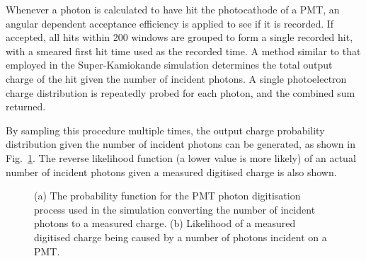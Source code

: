 Whenever a photon is calculated to have hit the photocathode of a PMT, an angular dependent
acceptance efficiency is applied to see if it is recorded. If accepted, all hits within
\unit{200}{} windows are grouped to form a single recorded hit, with a smeared first
hit time used as the recorded time. A method similar to that employed in the Super-Kamiokande
simulation determines the total output charge of the hit given the number of incident photons. A
single photoelectron charge distribution is repeatedly probed for each photon, and the combined
sum returned.

By sampling this procedure multiple times, the output charge probability distribution given the
number of incident photons can be generated, as shown in Fig.~\ref{fig:digitisation}. The reverse
likelihood function (a lower value is more likely) of an actual number of incident photons given a
measured digitised charge is also shown.

\begin{figure} %
    \centering
    \quad
    \caption[Detector simulation PMT digitisation function]
    {(a) The probability function for the PMT photon digitisation process used in the simulation
        converting the number of incident photons to a measured charge. (b) Likelihood of a
        measured digitised charge being caused by a number of photons incident on a PMT.}
    \label{fig:digitisation}
\end{figure}

